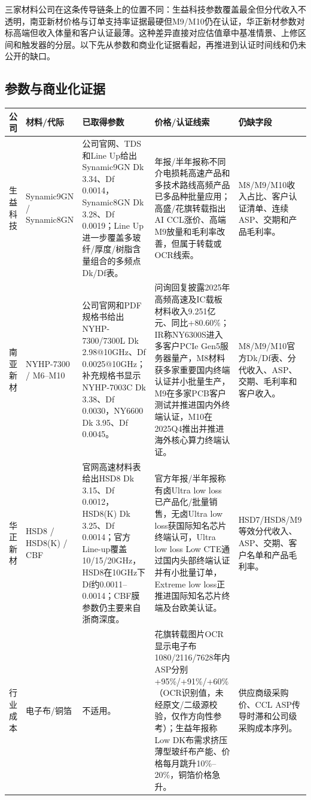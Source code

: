 三家材料公司在这条传导链条上的位置不同：生益科技参数覆盖最全但分代收入不透明，南亚新材价格与订单支持率证据最硬但M9/M10仍在认证，华正新材参数对标高端但收入体量和客户认证最薄。这种差异直接对应估值章中基准情景、上修区间和触发器的分层。以下先从参数和商业化证据看起，再推进到认证时间线和仍未公开的缺口。

\subsection{参数与商业化证据}

\begin{exhibitbox}[图表3-12：材料参数与价格序列补充]
\scriptsize
\begin{tabularx}{\textwidth}{L{1.8cm}L{2.1cm}X X X}
\toprule
\textbf{公司} & \textbf{材料/代际} & \textbf{已取得参数} & \textbf{价格/认证线索} & \textbf{仍缺字段} \\
\midrule
生益科技 & Synamic9GN / Synamic8GN & 公司官网、TDS和Line Up给出 Synamic9GN Dk 3.34、Df 0.0014，Synamic8GN Dk 3.28、Df 0.0019；Line Up进一步覆盖多玻纤/厚度/树脂含量组合的多频点Dk/Df表。 & 年报/半年报称不同介电损耗高速产品和多技术路线高频产品已多品种批量应用；高盛/花旗转载指出AI CCL涨价、高端M9放量和毛利率改善，但属于转载或OCR线索。 & M8/M9/M10收入占比、客户认证清单、连续ASP、交期和产品毛利率。 \\
南亚新材 & NYHP-7300 / M6--M10 & 公司官网和PDF规格书给出NYHP-7300/7300L Dk 2.98@10GHz、Df 0.0025@10GHz；补充规格书显示NYHP-7003C Dk 3.38、Df 0.0030，NY6600 Dk 3.95、Df 0.0045。 & 问询回复披露2025年高频高速及IC载板材料收入9.251亿元、同比+80.60\%；IR称NY6300S进入多客户PCIe Gen5服务器量产，M8材料获多家重要国内终端认证并小批量生产，M9在多家PCB客户测试并推进国内外终端认证，M10在2025Q4推出并推进海外核心算力终端认证。 & M8/M9/M10官方Dk/Df表、分代收入、ASP、交期、毛利率和客户收入。 \\
华正新材 & HSD8 / HSD8(K) / CBF & 官网高速材料表给出HSD8 Dk 3.15、Df 0.0012，HSD8(K) Dk 3.25、Df 0.0014；官方Line-up覆盖10/15/20GHz，HSD8在10GHz下Df约0.0011--0.0014；CBF膜参数仍主要来自浙商深度。 & 官方年报/半年报称有卤Ultra low loss已产品化/批量销售，无卤Ultra low loss获国际知名芯片终端认可，Ultra low loss Low CTE通过国内头部终端认证并有小批量订单，Extreme low loss正推进国际知名芯片终端及台欧美认证。 & HSD7/HSD8/M9等效分代收入、ASP、交期、客户名单和产品毛利率。 \\
行业成本 & 电子布/铜箔 & 不适用。 & 花旗转载图片OCR显示电子布1080/2116/7628年内ASP分别+95\%/+91\%/+60\%（OCR识别值，未经原文/二级源校验，仅作方向性参考）；生益年报称Low DK布需求挤压薄型玻纤布产能、价格每月跳升10\%--20\%，铜箔价格急升。 & 供应商级采购价、CCL ASP传导时滞和公司级采购成本序列。 \\
\bottomrule
\end{tabularx}
\end{exhibitbox}

